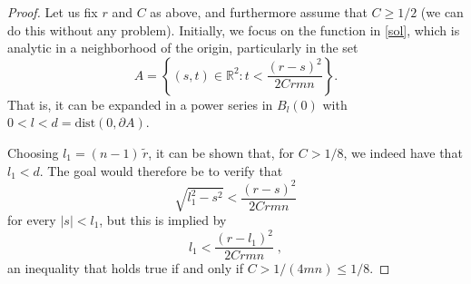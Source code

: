 \begin{proof}
Let us fix $r$ and $C$ as above, and furthermore assume that $C \geq 1/2$ (we can do this without any problem). 
Initially, we focus on the function in \eqref{sol}, which is analytic in a neighborhood of the origin, particularly in the set 
$$A = \left\{ (s,t) \in \mathbb{R}^2 : t<\frac{(r-s)^2}{2Crmn} \right\} .$$
That is, it can be expanded in a power series in $B_l(0)$ with $0<l<d=\text{dist}(0, \partial A)$.
\begin{center}
\end{center}
Choosing $l_1 = (n-1)\,\widetilde{r}$, it can be shown that, for $C>1/8$, we indeed have that $l_1<d$. The goal would therefore be to verify that $$\sqrt{l_1^2-s^2} < \frac{(r-s)^2}{2Crmn}$$ for every $|s|<l_1$, but this is implied by 
\begin{equation} \label{l1}
l_1 < \frac{(r-l_1)^2}{2Crmn}\; ,
\end{equation}
an inequality that holds true if and only if $C > 1/(4mn) \leq 1/8$.


\end{proof}
